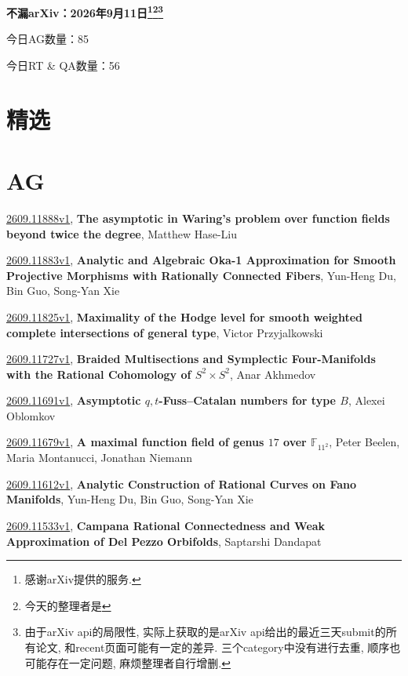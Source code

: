 \documentclass[9pt, a4paper]{article}
\theoremstyle{plain}
\theoremstyle{definition}
\theoremstyle{remark}
\newcommand{\arxiv}[3]{\href{https://arxiv.org/abs/#1}{#1}, \textbf{\textcolor{arxivblue}{#2}}, #3}
\newcommand{\AGnumber}{85}
\newcommand{\RTQAnumber}{56}
\newcommand{\NewestDate}{2026年9月11日}
\newcommand{\todayarXiver}{} %
\begin{document}
\begin{center}
    \Huge\textbf{不漏arXiv：\NewestDate\footnote{感谢arXiv提供的服务.}\footnote{今天的整理者是\todayarXiver}\footnote{由于arXiv api的局限性, 实际上获取的是arXiv api给出的最近三天submit的所有论文, 和recent页面可能有一定的差异. 三个category中没有进行去重, 顺序也可能存在一定问题, 麻烦整理者自行增删.}} \\
\end{center}

\setcounter{section}{-1}

\begin{center}
    今日AG数量：\AGnumber
    
    今日RT \& QA数量：\RTQAnumber
    
\end{center}


\section{精选}


\section{AG}
\arxiv{2609.11888v1}{The asymptotic in Waring's problem over function fields beyond twice the degree}{Matthew Hase-Liu}

\arxiv{2609.11883v1}{Analytic and Algebraic Oka-1 Approximation for Smooth Projective Morphisms with Rationally Connected Fibers}{Yun-Heng Du, Bin Guo, Song-Yan Xie}

\arxiv{2609.11825v1}{Maximality of the Hodge level for smooth weighted complete intersections of general type}{Victor Przyjalkowski}

\arxiv{2609.11727v1}{Braided Multisections and Symplectic Four-Manifolds with the Rational Cohomology of $S^2\times S^2$}{Anar Akhmedov}

\arxiv{2609.11691v1}{Asymptotic $q,t$-Fuss--Catalan numbers for type $B$}{Alexei Oblomkov}

\arxiv{2609.11679v1}{A maximal function field of genus $17$ over $\mathbb{F}_{11^2}$}{Peter Beelen, Maria Montanucci, Jonathan Niemann}

\arxiv{2609.11612v1}{Analytic Construction of Rational Curves on Fano Manifolds}{Yun-Heng Du, Bin Guo, Song-Yan Xie}

\arxiv{2609.11533v1}{Campana Rational Connectedness and Weak Approximation of Del Pezzo Orbifolds}{Saptarshi Dandapat}
\end{document}

